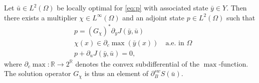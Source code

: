 \documentclass[reqno]{shinyart}
\begin{document}
\begin{theorem}\label{thm:kktlimit}
    Let $\bar{u} \in L^2(\Omega)$ be locally optimal for \eqref{eq:p} with associated state 
    $\bar{y} \in Y$. Then there exists a multiplier $\chi \in L^\infty(\Omega)$ 
    and an adjoint state $p\in L^2(\Omega)$ such that 
    \begin{subequations}\label{eq:BKKT}
        \begin{align}
            &p = (G_\chi)^* \partial_y J(\bar{y}, \bar{u}) \label{eq:BKKTad}\\
            &\chi(x) \in \partial_c \max(\bar{y}(x)) \quad \text{a.e.\ in }\Omega \label{eq:BKKTsubdiff}\\
            &p + \partial_u J(\bar{y}, \bar{u}) = 0, \label{eq:BKKTgradeq}
        \end{align} 
    \end{subequations}
    where $\partial_c \max : {\mathbb{R}} \to 2^{\mathbb{R}}$ denotes the convex subdifferential 
    of the $\max$-function. The solution operator $G_\chi$ is thus an element of $\partial^{sw}_B S(\bar{u})$.
\end{theorem}
\end{document}
